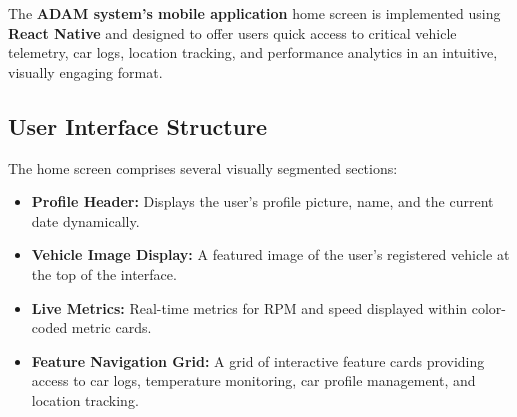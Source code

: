 


    The \textbf{ADAM system’s mobile application} home screen is implemented using \textbf{React Native} and designed to offer users quick access to critical vehicle telemetry, car logs, location tracking, and performance analytics in an intuitive, visually engaging format.

    \subsection{User Interface Structure}
    The home screen comprises several visually segmented sections:

    \begin{itemize}
        \item \textbf{Profile Header:} Displays the user's profile picture, name, and the current date dynamically.
        \item \textbf{Vehicle Image Display:} A featured image of the user’s registered vehicle at the top of the interface.
        \item \textbf{Live Metrics:} Real-time metrics for RPM and speed displayed within color-coded metric cards.
        \item \textbf{Feature Navigation Grid:} A grid of interactive feature cards providing access to car logs, temperature monitoring, car profile management, and location tracking.
    \end{itemize}

